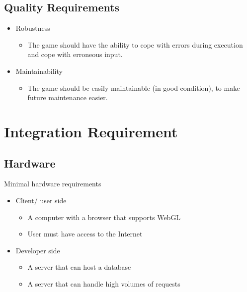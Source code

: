 \documentclass{article}
\begin{document}
   \subsection{Quality Requirements} 
   \begin{itemize}
    \item Robustness
		\begin{itemize}
			\item The game should have the ability to cope with errors during execution and cope with erroneous input.
	    		
	    \end{itemize}
	    
	    \item Maintainability
		\begin{itemize}
			\item The game should be easily maintainable (in good condition), to make future maintenance easier.
         \end{itemize}
        \end{itemize}
   
  \section{Integration Requirement}
    \subsection{Hardware}
    Minimal hardware requirements
	\begin{itemize}
		\item Client/ user side	
		\begin{itemize}
			\item A computer with a browser that supports WebGL 
			\item User must have access to the Internet 
		\end{itemize}
		\item Developer side
		\begin{itemize}
			\item A server that can host a database 
			\item A server that can handle high volumes of requests
		\end{itemize}
	\end{itemize}
\end{document}
